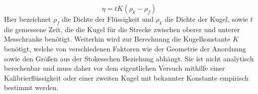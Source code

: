 \begin{equation}
\eta = tK(\rho_k - \rho_f)
\end{equation}
Hier bezeichnet $\rho_f$ die Dichte der Flüssigkeit und $\rho_k$ die Dichte der Kugel, sowie $t$ die gemessene Zeit, die die Kugel für die Strecke zwischen oberer und unterer Messchranke benötigt. Weiterhin wird zur Berechunng die Kugelkonstante $K$ benötigt, welche von verschiedenen Faktoren wie der Geometrie der Anordnung sowie den Größen aus der Stokesschen Beziehung abhängt. Sie ist nicht analytisch berechenbar und muss daher vor dem eigentlichen Versuch mithilfe einer Kalibrierflüssigkeit oder einer zweiten Kugel mit bekannter Konstante empirisch bestimmt werden.
